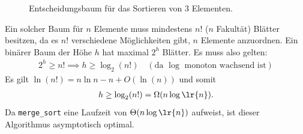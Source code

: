 \begin{figure}[H]
    \centering
    \caption{Entscheidungsbaum für das Sortieren von 3 Elementen.}
    \label{fig:decisiontree}
\end{figure}

Ein solcher Baum für $n$ Elemente muss mindestens $n!$ ($n$ Fakultät) Blätter besitzen, da es $n!$ verschiedene Möglichkeiten gibt, $n$ Elemente anzuordnen. Ein binärer Baum der Höhe $h$ hat maximal $2^h$ Blätter. Es muss also gelten:
\begin{align*}
	2^h \geq n! \implies h \geq \log_2(n!) \quad (\text{da $\log$ monoton wachsend ist})
\end{align*}
Es gilt $\ln(n!) = n \ln n - n + O(\ln(n))$ und somit 
\begin{align*}
	h \geq \log_2(n!) = \Omega(n\log\lr{n}).
\end{align*}
Da \lstinline{merge_sort} eine Laufzeit von $\Theta(n \log\lr{n})$ aufweist, ist dieser Algorithmus asymptotisch optimal.


\clearpage
